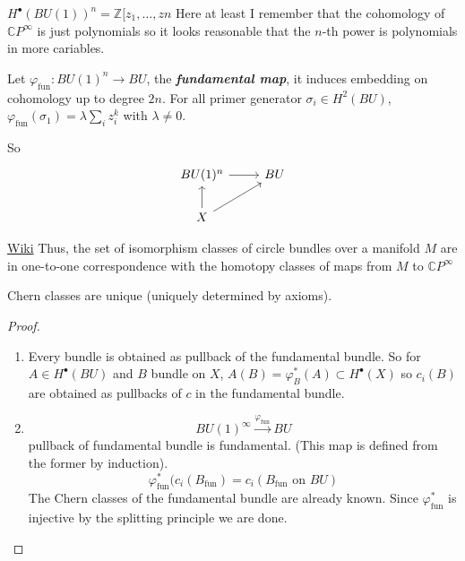\begin{remark}
	$H^{\bullet}(BU(1))^n=\mathbb{Z}[z_1,\ldots,zn$ 
	Here at least I remember that the cohomology of $\mathbb{C}P^{\infty}$ is just polynomials so it looks reasonable that the $n$-th power is polynomials in more cariables.
\end{remark}

\begin{thm}\leavevmode
	Let $\varphi_{\operatorname{f un}}:BU(1)^n\to BU$, the \textit{\textbf{fundamental map}}, it induces embedding on cohomology up to degree $2n$. For all primer generator $\sigma_i\in H^{2}(BU)$, $\varphi_{\operatorname{f un}}(\sigma_1)=\lambda \sum_{i}z_i^k$ with $\lambda\neq 0$.

	So
	\[\begin{tikzcd}
		BU(1)^n \arrow[r]& BU\\
		X\arrow[u]\arrow[ur]
	\end{tikzcd}\]
	
\end{thm}

\begin{remark}
	\href{https://en.wikipedia.org/wiki/Classifying_space_for_U(n)}{Wiki} Thus, the set of isomorphism classes of circle bundles over a manifold $M$ are in one-to-one correspondence with the homotopy classes of maps from $M$ to $\mathbb{C}P^{\infty}$
\end{remark}

\begin{thm}
	Chern classes are unique (uniquely determined by axioms).
\end{thm}

\begin{proof}\leavevmode 
	\begin{enumerate}[label=\textbf{Step \arabic*}]
		\item Every bundle is obtained as pullback of the fundamental bundle. So for $A\in H^{\bullet}(BU)$ and $B$ bundle on $X$, $A(B)=\varphi^*_{B}(A)\subset H^{\bullet}(X)$ so $c_i(B)$ are obtained as pullbacks of $ c$ in the fundamental bundle.

		\item \[BU(1)^\infty \overset{\varphi_{\operatorname{f un}}}{\longrightarrow}BU\]
			pullback of fundamental bundle is fundamental. (This map is defined from the former by induction).
			\[\varphi^*_{\operatorname{fu n}}(c_i(B_{\operatorname{f un}})=c_i(B_{\operatorname{f un}}\text{ on $BU$} )\]
			The Chern classes of the fundamental bundle are already known. Since $\varphi^*_{\operatorname{f un}}$ is injective by the splitting principle we are done.
	\end{enumerate}
\end{proof}

